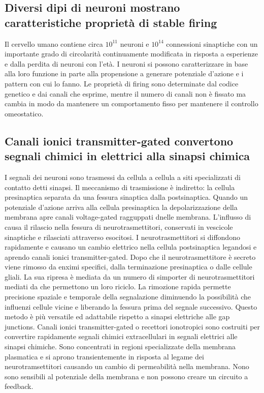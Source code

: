 \subsection{Diversi dipi di neuroni mostrano caratteristiche propriet\`a di stable firing}
Il cervello umano contiene circa $10^{11}$ neuroni e $10^{14}$ connessioni sinaptiche con un importante grado di circolarit\`a continuamente modificata in risposta a esperienze e dalla
perdita di neuroni con l'et\`a. I neuroni si possono caratterizzare in base alla loro funzione in parte alla propensione a generare potenziale d'azione e i pattern con cui lo fanno. 
Le propriet\`a di firing sono determinate dal codice genetico e dai canali che esprime, mentre il numero di canali non \`e fissato ma cambia in modo da mantenere un comportamento fisso
per mantenere il controllo omeostatico. 
\subsection{Canali ionici transmitter-gated convertono segnali chimici in elettrici alla sinapsi chimica}
I segnali dei neuroni sono trasmessi da cellula a cellula a siti specializzati di contatto detti sinapsi. Il meccanismo di trasmissione \`e indiretto: la cellula presinaptica separata
da una fessura sinaptica dalla postsinaptica. Quando un potenziale d'azione arriva alla cellula presinaptica la depolarizzazione della membrana apre canali voltage-gated 
ragguppati dnelle membrana. L'influsso di  causa il rilascio nella fessura di neurotrasmettitori, conservati in vescicole sinaptiche e rilasciati attraverso esocitosi. I
neurotrasmettitori si diffondono rapidamente e causano un cambio elettrico nella cellula postsinaptica legandosi e aprendo canali ionici transmitter-gated. Dopo che il neurotrasmettitore
\`e secreto viene rimosso da enximi specifici, dalla terminazione presinaptica o dalle cellule gliali. La sua ripresa \`e mediata da un numero di simporter di neurotrasmettitori mediati
da  che permettono un loro riciclo. La rimozione rapida permette precisione spaziale e temporale della segnalazione diminuendo la possibilit\`a che influenzi cellule vicine e
liberando la fessura prima del segnale successivo. Questo metodo \`e pi\`u versatile ed adattabile rispetto a sinapsi elettriche alle gap junctions. Canali ionici transmitter-gated o 
recettori ionotropici sono costruiti per convertire rapidamente segnali chimici extracellulari in segnali elettrici alle sinapsi chimiche. Sono concentrati in regioni specializzate
della membrana plasmatica e si aprono transientemente in risposta al legame dei neurotramsettitori causando un cambio di permeabilit\`a nella membrana. Nono sono sensibili al potenziale
della membrana e non possono creare un circuito a feedback. 
